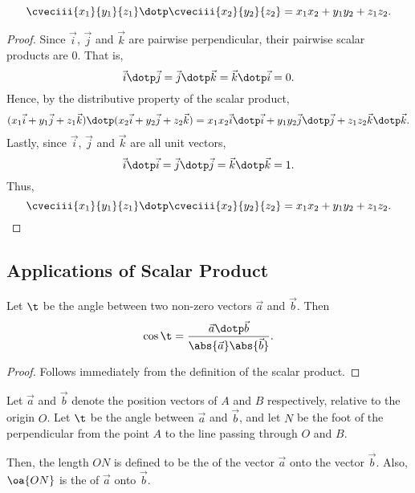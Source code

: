 \begin{proposition}
    \[\cveciii{x_1}{y_1}{z_1} \dotp \cveciii{x_2}{y_2}{z_2} = x_1 x_2 + y_1 y_2 + z_1 z_2.\]
\end{proposition}
\begin{proof}
    Since $\vec i$, $\vec j$ and $\vec k$ are pairwise perpendicular, their pairwise scalar products are 0. That is, \[\vec i \dotp \vec j = \vec j \dotp \vec k = \vec k \dotp \vec i = 0.\] Hence, by the distributive property of the scalar product, \[(x_1 \vec i + y_1 \vec j + z_1 \vec k) \dotp (x_2 \vec i + y_2 \vec j + z_2 \vec k) = x_1 x_2 \vec i \dotp \vec i + y_1 y_2 \vec j \dotp \vec j + z_1 z_2 \vec k \dotp \vec k.\] Lastly, since $\vec i$, $\vec j$ and $\vec k$ are all unit vectors, \[\vec i \dotp \vec i = \vec j \dotp \vec j = \vec k \dotp \vec k = 1.\] Thus, \[\cveciii{x_1}{y_1}{z_1} \dotp \cveciii{x_2}{y_2}{z_2} = x_1 x_2 + y_1 y_2 + z_1 z_2.\]
\end{proof}

\subsection{Applications of Scalar Product}

\begin{proposition}
    Let $\t$ be the angle between two non-zero vectors $\vec a$ and $\vec b$. Then \[\cos \t = \frac{\vec a \dotp \vec b}{\abs{\vec a} \abs{\vec b}}.\]
\end{proposition}
\begin{proof}
    Follows immediately from the definition of the scalar product.
\end{proof}

\begin{definition}
    Let $\vec a$ and $\vec b$ denote the position vectors of $A$ and $B$ respectively, relative to the origin $O$. Let $\t$ be the angle between $\vec a$ and $\vec b$, and let $N$ be the foot of the perpendicular from the point $A$ to the line passing through $O$ and $B$.

    Then, the length $ON$ is defined to be the  of the vector $\vec a$ onto the vector $\vec b$. Also, $\oa{ON}$ is the  of $\vec a$ onto $\vec b$.
\end{definition}

